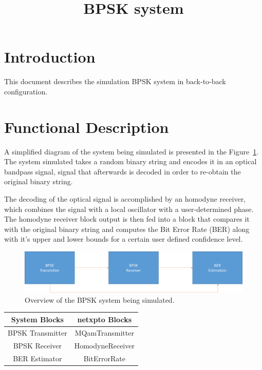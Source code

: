 \documentclass[a4paper]{article}
\title{BPSK system}
\author{ }
\date{ }
\newcommand{\onlyinsubfile}[1]{#1}
\newcommand{\notinsubfile}[1]{}
\begin{document}
\renewcommand{\onlyinsubfile}[1]{}
\renewcommand{\notinsubfile}[1]{#1}

\maketitle

\section{Introduction}

This document describes the simulation BPSK system in back-to-back configuration. 

\section{Functional Description}

A simplified diagram of the system being simulated is presented in the Figure~\ref{fig:homodynesystem}. The system simulated takes a random binary string and encodes it in an optical bandpass signal, signal that afterwards is decoded in order to re-obtain the original binary string.
\par
The decoding of the optical signal is accomplished by an homodyne receiver, which combines the signal with a local oscillator with a user-determined phase. The homodyne receiver block output is then fed into a block that compares it with the original binary string and computes the Bit Error Rate (BER) along with it's upper and lower bounds for a certain user defined confidence level.

\begin{figure}[h]
\centering
\includegraphics[width=\linewidth]{bpskdiagram.png}
\caption{Overview of the BPSK system being simulated.}
\label{fig:homodynesystem}
\end{figure}

\begin{table}[H]
\centering
\begin{tabular}{c|c}
System Blocks    & netxpto Blocks   \\ \hline
BPSK Transmitter & MQamTransmitter  \\
BPSK Receiver    & HomodyneReceiver \\
BER Estimator    & BitErrorRate                      
\end{tabular}
\end{table}
\end{document}
